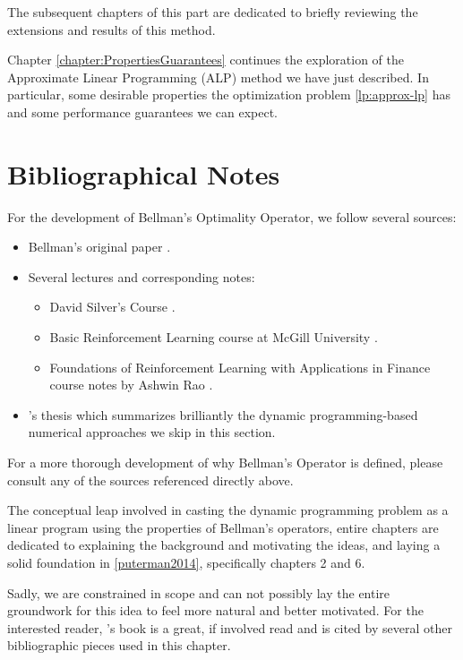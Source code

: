 The subsequent chapters of this part are dedicated to briefly reviewing the
extensions and results of this method.

Chapter \ref{chapter:PropertiesGuarantees} continues the exploration of the
Approximate Linear Programming (ALP) method we have just described. In
particular, some desirable properties the optimization problem
\eqref{lp:approx-lp} has and some performance guarantees we can expect.


\section{Bibliographical Notes}

For the development of Bellman's Optimality Operator, we follow several sources:
\begin{itemize}
    \item Bellman's original paper \cite{bellman1957}.
    \item Several lectures and corresponding notes:
    \begin{itemize}
        \item David Silver's Course \cite[Lects.~2-3]{silver2015}.
        \item Basic Reinforcement Learning course at McGill University
            \cite[Lect.~2]{moisescu-parejaa}.
        \item Foundations of Reinforcement Learning with Applications in Finance
            course notes by Ashwin Rao \cite[Lect. on Jan 15 2019]{raoRL4F}.
    \end{itemize}
    \item \citeauthor{nadeemward2021}'s thesis \cite{nadeemward2021} which
        summarizes brilliantly the dynamic programming-based numerical
        approaches we skip in this section.
\end{itemize}

For a more thorough development of why Bellman's Operator is defined, please
consult any of the sources referenced directly above.

The conceptual leap involved in casting the dynamic programming problem as a
linear program using the properties of Bellman's operators, entire chapters are
dedicated to explaining the background and motivating the ideas, and laying a
solid foundation in \ref{puterman2014}, specifically chapters 2 and 6.

Sadly, we are constrained in scope and can not possibly lay the entire
groundwork for this idea to feel more natural and better motivated. For the
interested reader, \citeauthor{puterman2014}'s book is a great, if involved
read and is cited by several other bibliographic pieces used in this chapter.